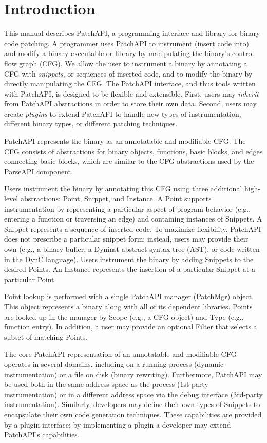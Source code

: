 \section{Introduction}
\label{sec-intro}

This manual describes PatchAPI, a programming interface and library
for binary code patching. A programmer uses PatchAPI to instrument
(insert code into) and modify a binary executable or library by
manipulating the binary's control flow graph (CFG). We allow the user
to instrument a binary by annotating a CFG with \emph{snippets}, or
sequences of inserted code, and to modify the binary by directly
manipulating the CFG. The PatchAPI interface, and thus tools written
with PatchAPI, is designed to be flexible and extensible. First, users
may \emph{inherit} from PatchAPI abstractions in order to store their
own data. Second, users may create \emph{plugins} to extend PatchAPI
to handle new types of instrumentation, different binary types, or
different patching techniques. 

PatchAPI represents the binary as an annotatable and modifiable CFG. The CFG
consists of abstractions for binary objects, functions, basic blocks, and edges
connecting basic blocks, which are similar to the CFG abstractions used by the
ParseAPI component.

Users instrument the binary by annotating this CFG using three additional
high-level abstractions: Point, Snippet, and Instance.  A Point supports
instrumentation by representing a particular aspect of program behavior (e.g.,
entering a function or traversing an edge) and containing instances of Snippets.
A Snippet represents a sequence of inserted code. To maximize flexibility,
PatchAPI does not prescribe a particular snippet form; instead, users may
provide their own (e.g., a binary buffer, a Dyninst abstract syntax tree (AST),
or code written in the DynC language). Users instrument the binary by adding
Snippets to the desired Points. An Instance represents the insertion of a
particular Snippet at a particular Point.

Point lookup is performed with a single PatchAPI manager (PatchMgr) object. This
object represents a binary along with all of its dependent libraries. Points are
looked up in the manager by Scope (e.g., a CFG object) and Type (e.g., function
entry). In addition, a user may provide an optional Filter that selects a
subset of matching Points.

The core PatchAPI representation of an annotatable and modifiable CFG
operates in several domains, including on a running process (dynamic
instrumentation) or a file on disk (binary rewriting). Furthermore,
PatchAPI may be used both in the same address space as the process
(1st-party instrumentation) or in a different address space via the
debug interface (3rd-party instrumentation). Similarly, developers may
define their own types of Snippets to encapsulate their own code
generation techniques. These capabilities are provided by a plugin
interface; by implementing a plugin a developer may extend PatchAPI's
capabilities.

